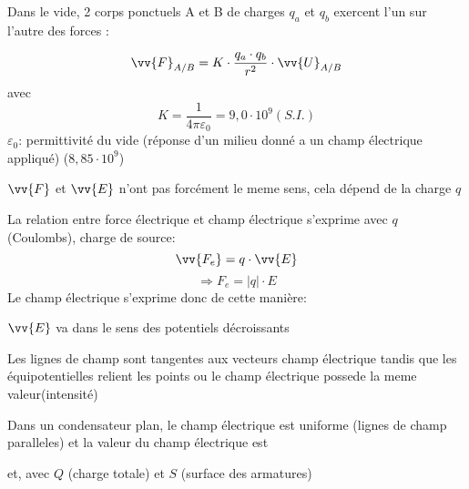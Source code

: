 \documentclass[main.tex]{subfiles}
\begin{document}
\begin{Definition}
    Dans le vide, 2 corps ponctuels A et B de charges $q_{a}$ et $q_{b}$ exercent l'un sur l'autre des forces :

    $$ \vv{F}_{A/B} = K \cdot \dfrac{q_{a}\cdot q_{b}}{r^2} \cdot \vv{U}_{A/B} $$
    avec
    $$K=\dfrac{1}{4\pi\varepsilon_{0}}= 9,0\cdot 10^9(S.I.)$$
    $\varepsilon_{0}$: permittivité du vide (réponse d'un milieu donné a un champ électrique appliqué) ($8,85\cdot 10^9$)

    \danger[5ex] \qquad $\vv{F}$ et $\vv{E}$ n'ont pas forcément le meme sens, cela dépend de la charge $q$

    La relation entre force électrique et champ électrique s'exprime avec $q$ (Coulombs), charge de source:
    $$\vv{F_{e}}=q\cdot \vv{E}$$
    $$\Rightarrow F_{e}=|q|\cdot E$$
    Le champ électrique s'exprime donc de cette manière:


    $\vv{E}$ va dans le sens des potentiels décroissants

    Les lignes de champ sont tangentes aux vecteurs champ électrique tandis que les équipotentielles relient les points ou le champ électrique possede la meme valeur(intensité)

    Dans un condensateur plan, le champ électrique est uniforme (lignes de champ paralleles) et la valeur du champ électrique est


    et, avec $Q$ (charge totale) et $S$ (surface des armatures)
    
\end{Definition}
\end{document}
